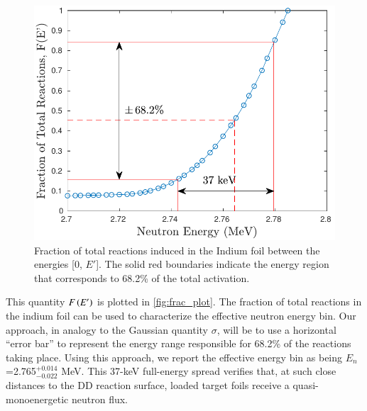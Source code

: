 \begin{figure}
 \centering
 \includegraphics[scale=0.6]{./figures/fracplot_new.pdf}
 \caption{Fraction of total reactions induced in the Indium foil between the energies [0, $E'$]. The solid red boundaries indicate the energy region that corresponds to 68.2\% of the total activation.}
 \label{fig:frac_plot}
\end{figure}



This quantity $F\left( E'\right)$ is plotted in \autoref{fig:frac_plot}.
The fraction of total reactions in the indium foil can be used to characterize the effective neutron energy bin.
 Our approach, in analogy to the Gaussian quantity $\sigma$, will be to use a horizontal \enquote{error bar}  to represent the energy range responsible for 68.2\% of the reactions taking place.
 Using this approach, we report the effective energy bin as being $E_n$=2.765$^{+0.014}_{-0.022}$ MeV.
This 37-keV full-energy spread verifies that, at such close distances to the DD reaction surface, loaded target foils receive a quasi-monoenergetic neutron flux.
 

 






